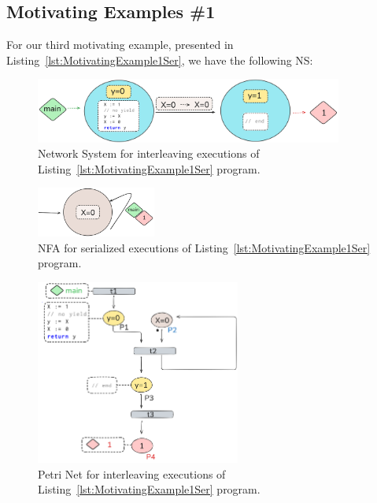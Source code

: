 \subsection{Motivating Examples \#1}
\label{appendix:subsec::Ex1A:NS}


For our third motivating example, presented in Listing~\ref{lst:MotivatingExample1Ser}, we have the following NS:



\begin{figure}[!htbp]
	\centering
	\includegraphics[width=0.9\textwidth]{plots/code_1_NS.png}
	\caption{Network System for interleaving executions of Listing~\ref{lst:MotivatingExample1Ser} program.}
	\label{fig:code1ExampleNS}
\end{figure}


\begin{figure}[!htbp]
	\centering
	\includegraphics[width=0.35\textwidth]{plots/code_1_NFA.png}
	\caption{NFA for serialized executions of Listing~\ref{lst:MotivatingExample1Ser} program.}
	\label{fig:code1ExampleNFA}
\end{figure}



\begin{figure}[!htbp]
	\centering
	\includegraphics[width=0.6\textwidth]{plots/code_1_PN_with_annotation.png}
	\caption{Petri Net for interleaving executions of Listing~\ref{lst:MotivatingExample1Ser} program.}
	\label{fig:code1ExamplePN}
\end{figure}

